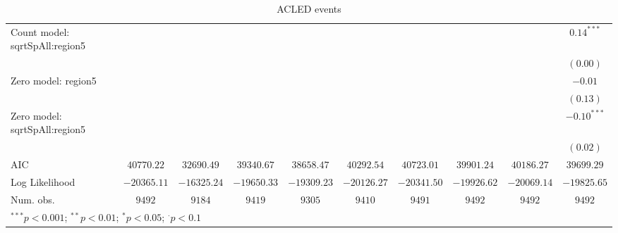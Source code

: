 \begin{sidewaystable}
\begin{center}
{\begin{tabular}{l c c c c c c c c c}
Count model: sqrtSpAll:region5 &                &               &               &               &               &                &               &                & $0.14^{***}$  \\
                               &                &               &               &               &               &                &               &                & $(0.00)$      \\
Zero model: region5            &                &               &               &               &               &                &               &                & $-0.01$       \\
                               &                &               &               &               &               &                &               &                & $(0.13)$      \\
Zero model: sqrtSpAll:region5  &                &               &               &               &               &                &               &                & $-0.10^{***}$ \\
                               &                &               &               &               &               &                &               &                & $(0.02)$      \\
\midrule
AIC                            & $40770.22$     & $32690.49$    & $39340.67$    & $38658.47$    & $40292.54$    & $40723.01$     & $39901.24$    & $40186.27$     & $39699.29$    \\
Log Likelihood                 & $-20365.11$    & $-16325.24$   & $-19650.33$   & $-19309.23$   & $-20126.27$   & $-20341.50$    & $-19926.62$   & $-20069.14$    & $-19825.65$   \\
Num. obs.                      & $9492$         & $9184$        & $9419$        & $9305$        & $9410$        & $9491$         & $9492$        & $9492$         & $9492$        \\
\bottomrule
\multicolumn{10}{l}{\scriptsize{$^{***}p<0.001$; $^{**}p<0.01$; $^{*}p<0.05$; $^{\cdot}p<0.1$}}
\end{tabular}
}
\caption{ACLED
	       events}
\label{zacledev}
\end{center}
\end{sidewaystable}
